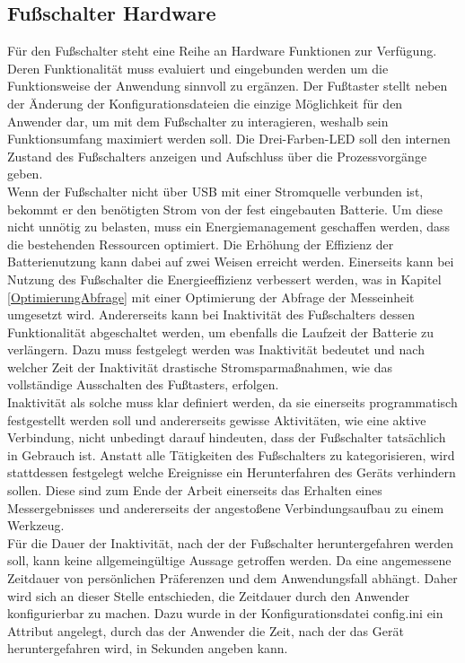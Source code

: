 \subsection{Fußschalter Hardware}
Für den Fußschalter steht eine Reihe an Hardware Funktionen zur Verfügung. Deren Funktionalität muss evaluiert und eingebunden werden um die Funktionsweise der Anwendung sinnvoll zu ergänzen. Der Fußtaster stellt neben der Änderung der Konfigurationsdateien die einzige Möglichkeit für den Anwender dar, um mit dem Fußschalter zu interagieren, weshalb sein Funktionsumfang maximiert werden soll. Die Drei-Farben-LED soll den internen Zustand des Fußschalters anzeigen und Aufschluss über die Prozessvorgänge geben.\\
Wenn der Fußschalter nicht über \ac{USB} mit einer Stromquelle verbunden ist, bekommt er den benötigten Strom von der fest eingebauten Batterie. Um diese nicht unnötig zu belasten, muss ein Energiemanagement geschaffen werden, dass die bestehenden Ressourcen optimiert. Die Erhöhung der Effizienz der Batterienutzung kann dabei auf zwei Weisen erreicht werden. Einerseits kann bei Nutzung des Fußschalter die Energieeffizienz verbessert werden, was in Kapitel \ref{OptimierungAbfrage} mit einer Optimierung der Abfrage der Messeinheit umgesetzt wird. Andererseits kann bei Inaktivität des Fußschalters dessen Funktionalität abgeschaltet werden, um ebenfalls die Laufzeit der Batterie zu verlängern. Dazu muss festgelegt werden was Inaktivität bedeutet und nach welcher Zeit der Inaktivität drastische Stromsparmaßnahmen, wie das vollständige Ausschalten des Fußtasters, erfolgen.\\
Inaktivität als solche muss klar definiert werden, da sie einerseits programmatisch festgestellt werden soll und andererseits gewisse Aktivitäten, wie eine aktive Verbindung, nicht unbedingt darauf hindeuten, dass der Fußschalter tatsächlich in Gebrauch ist. Anstatt alle Tätigkeiten des Fußschalters zu kategorisieren, wird stattdessen festgelegt welche Ereignisse ein Herunterfahren des Geräts verhindern sollen. Diese sind zum Ende der Arbeit einerseits das Erhalten eines Messergebnisses und andererseits der angestoßene Verbindungsaufbau zu einem Werkzeug.\\
Für die Dauer der Inaktivität, nach der der Fußschalter heruntergefahren werden soll, kann keine allgemeingültige Aussage getroffen werden. Da eine angemessene Zeitdauer von persönlichen Präferenzen und dem Anwendungsfall abhängt. Daher wird sich an dieser Stelle entschieden, die Zeitdauer durch den Anwender konfigurierbar zu machen. Dazu wurde in der Konfigurationsdatei config.ini ein Attribut angelegt, durch das der Anwender die Zeit, nach der das Gerät heruntergefahren wird, in Sekunden angeben kann.